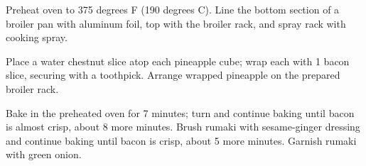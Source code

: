 \begin{preparation}
	\step Preheat oven to 375 degrees F (190 degrees C). Line the bottom section of a broiler pan with aluminum foil, top with the broiler rack, and spray rack with cooking spray.
	
	\step Place a water chestnut slice atop each pineapple cube; wrap each with 1 bacon slice, securing with a toothpick. Arrange wrapped pineapple on the prepared broiler rack. 
	
	\step Bake in the preheated oven for 7 minutes; turn and continue baking until bacon is almost crisp, about 8 more minutes. Brush rumaki with sesame-ginger dressing and continue baking until bacon is crisp, about 5 more minutes. Garnish rumaki with green onion. 
\end{preparation}


\begin{notes}
\end{notes}

